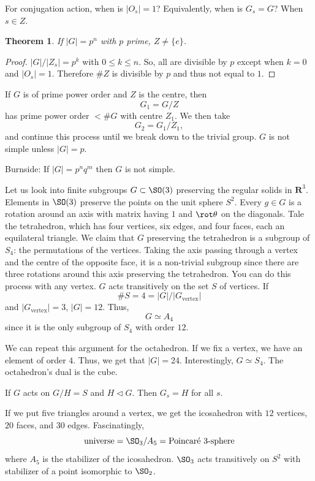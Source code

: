 \documentclass[11pt, oneside]{amsart}
\numberwithin{equation}{section}
\newtheorem{theorem}{Theorem}
\numberwithin{theorem}{section}
\theoremstyle{definition}
\def\R{\mathbf{R}}
\begin{document}
{For conjugation action, when is $|O_s|=1$? Equivalently, when is $G_s=G$? When $s\in Z$.

\begin{theorem}
If $|G|=p^n$ with $p$ prime, $Z\neq \{e\}$.
\end{theorem}
\begin{proof}
$|G|/|Z_s| = p^k$ with $0\leqslant k\leqslant n$. So, all are divisible by $p$ except when $k=0$ and $|O_s|=1$. Therefore $\#Z$ is divisible by $p$ and thus not equal to $1$.
\end{proof}

If $G$ is of prime power order and $Z$ is the centre, then 
$$
G_1 = G/Z
$$
has prime power order $<\#G$ with centre $Z_1$. We then take 
$$
G_2 = G_1/Z_1,
$$
and continue this process until we break down to the trivial group. $G$ is not simple unless $|G| = p$. 

Burnside: If $|G| = p^nq^m$ then $G$ is not simple. 

Let us look into finite subgroups $G \subset \SO(3)$ preserving the regular solids in $\R^3$. Elements in $\SO(3)$ preserve the points on the unit sphere $S^2$. Every $g\in G$ is a rotation around an axis with matrix having $1$ and $\rot \theta$ on the diagonals. Tale the tetrahedron, which has four vertices, six edges, and four faces, each an equilateral triangle. We claim that $G$ preserving the tetrahedron is a subgroup of $S_4$: the permutations of the vertices. Taking the axis passing through a vertex and the centre of the opposite face, it is a non-trivial subgroup since there are three rotations around this axis preserving the tetrahedron. You can do this process with any vertex. $G$ acts transitively on the set $S$ of vertices. If 
$$
\#S = 4 = |G|/|G_\textrm{vertex}|
$$
and $|G_\textrm{vertex}|=3$, $|G|=12$. Thus, 
$$
G\simeq A_4
$$
since it is the only subgroup of $S_4$ with order $12$.  %

We can repeat this argument for the octahedron. If we fix a vertex, we have an element of order $4$. Thus, we get that $|G|=24$. Interestingly, $G\simeq S_4$. The octahedron's dual is the cube.

If $G$ acts on $G/H=S$ and $H\lhd G$. Then $G_s = H$ for all $s$. 

If we put five triangles around a vertex, we get the icosahedron with $12$ vertices, $20$ faces, and $30$ edges. Fascinatingly, 
$$
\textrm{universe} = \SO_3 / A_5 = \mathrm{Poincar\acute{e}} \textrm{ $3$-sphere}
$$ 
where $A_5$ is the stabilizer of the icosahedron. $\SO_3$ acts transitively on $S^2$ with stabilizer of a point isomorphic to $\SO_2$.

}
\end{document}

